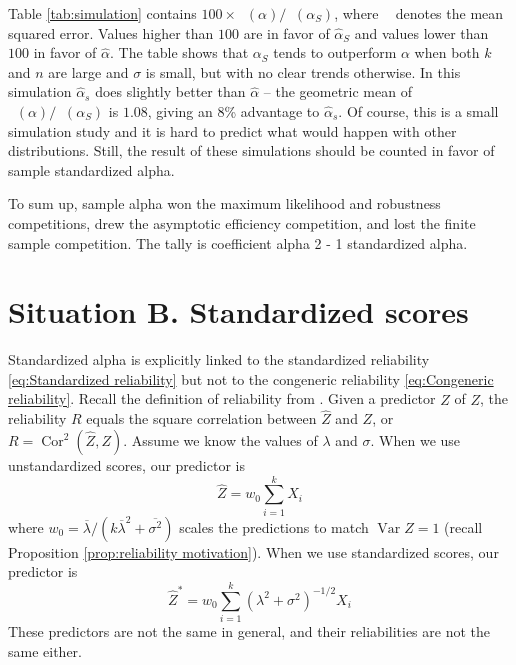 \documentclass[twoside]{article}
\DeclareMathOperator{\Var}{Var}
\DeclareMathOperator{\Cor}{Cor}
\DeclareMathOperator{\MSE}{MSE_Z}
\begin{document}
Table \ref{tab:simulation} contains $100 \times \MSE(\alpha)/\MSE(\alpha_S)$, where $\MSE$ denotes the mean squared error. Values higher than $100$ are in favor of $\hat{\alpha}_S$ and values lower than $100$ in favor of $\hat{\alpha}$. The table shows that $\alpha_S$ tends to outperform $\alpha$ when both $k$ and $n$ are large and $\sigma$ is small, but with no clear trends otherwise. In this simulation $\hat{\alpha}_s$ does slightly better than $\hat{\alpha}$ -- the geometric mean of $\MSE(\alpha)/\MSE({\alpha_S})$ is $1.08$, giving an $8$\% advantage to $\hat{\alpha}_s$. Of course, this is a small simulation study and it is hard to predict what would happen with other distributions. Still, the result of these simulations should be counted in favor of sample standardized alpha.

To sum up, sample alpha won the maximum likelihood and robustness competitions, drew the asymptotic efficiency competition, and lost the finite sample competition. The tally is coefficient alpha 2 - 1 standardized alpha. 



\section{Situation B. Standardized scores}
\label{sec:argument B}

Standardized alpha is explicitly linked to the standardized reliability \eqref{eq:Standardized reliability} but not to the congeneric reliability \eqref{eq:Congeneric reliability}. Recall the definition of reliability from
. Given a predictor $\hat{Z}$ of $Z$, the
reliability $ R$ equals the square correlation between $\hat{Z}$
and $Z$, or $ R=\Cor^{2}(\hat{Z},Z)$. Assume
we know the values of $\lambda$ and $\sigma$. When we use unstandardized
scores, our predictor is 
\begin{equation}
\hat{Z}=w_{0}\sum_{i=1}^{k}X_{i}\label{eq:sum score}
\end{equation}
where $w_{0}=\overline{\lambda}/(k\overline{\lambda}^{2}+\overline{\sigma^{2}})$ scales the predictions to match $\Var Z=1$ (recall Proposition \ref{prop:reliability motivation}). When we use standardized
scores, our predictor is
\begin{equation}
\hat{Z}^{*}=w_{0}\sum_{i=1}^{k}(\lambda^{2}+\sigma^{2})^{-1/2}X_{i}\label{eq:standardized sum score}
\end{equation}
These predictors are not the same in general, and their reliabilities are not
the same either.
\end{document}
